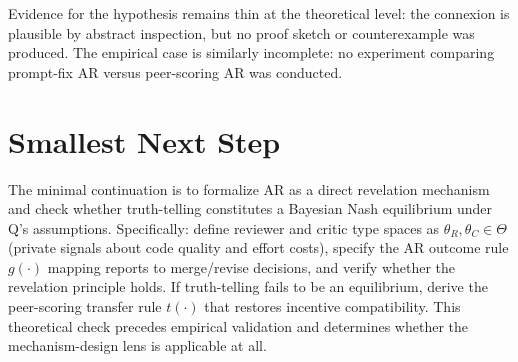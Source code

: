 \documentclass{article}
\begin{document}
Evidence for the hypothesis remains thin at the theoretical level: the connexion is plausible by abstract inspection, but no proof sketch or counterexample was produced. The empirical case is similarly incomplete: no experiment comparing prompt-fix AR versus peer-scoring AR was conducted.

\section*{Smallest Next Step}

The minimal continuation is to formalize AR as a direct revelation mechanism and check whether truth-telling constitutes a Bayesian Nash equilibrium under Q's assumptions. Specifically: define reviewer and critic type spaces as \( \theta_R, \theta_C \in \Theta \) (private signals about code quality and effort costs), specify the AR outcome rule \( g(\cdot) \) mapping reports to merge/revise decisions, and verify whether the revelation principle holds. If truth-telling fails to be an equilibrium, derive the peer-scoring transfer rule \( t(\cdot) \) that restores incentive compatibility. This theoretical check precedes empirical validation and determines whether the mechanism-design lens is applicable at all.
\end{document}
